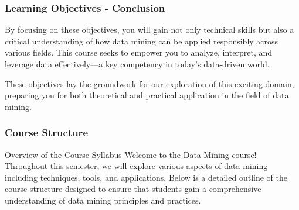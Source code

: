 \documentclass[aspectratio=169]{beamer}
\begin{document}
\begin{frame}[fragile]
    \frametitle{Learning Objectives - Conclusion}
    By focusing on these objectives, you will gain not only technical skills but also a critical understanding of how data mining can be applied responsibly across various fields. This course seeks to empower you to analyze, interpret, and leverage data effectively—a key competency in today’s data-driven world.
    
    These objectives lay the groundwork for our exploration of this exciting domain, preparing you for both theoretical and practical application in the field of data mining.
\end{frame}

\begin{frame}[fragile]
    \frametitle{Course Structure}
    \begin{block}{Overview of the Course Syllabus}
        Welcome to the Data Mining course! Throughout this semester, we will explore various aspects of data mining including techniques, tools, and applications. Below is a detailed outline of the course structure designed to ensure that students gain a comprehensive understanding of data mining principles and practices.
    \end{block}
\end{frame}
\end{document}
